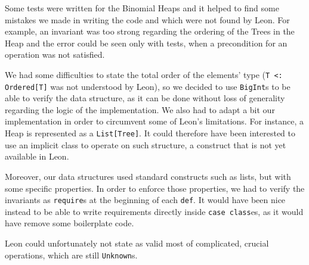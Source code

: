 Some tests were written for the Binomial Heaps and 
it helped to find some mistakes we made in writing the code and 
which were not found by Leon.
For example, an invariant was too strong regarding the ordering of the Trees in the Heap and 
the error could be seen only with tests,
when a precondition for an operation was not satisfied.

We had some difficulties to state the total order of the elements' type
(\texttt{T <: Ordered[T]} was not understood by Leon), 
so we decided to use \verb|BigInt|s to be able to verify the data structure,
as it can be done without loss of generality regarding the logic of the implementation.
We also had to adapt a bit our implementation in order to circumvent some of Leon's limitations.
For instance, a Heap is represented as a \texttt{List[Tree]}. 
It could therefore have been interested to use an implicit class to operate on such structure, 
a construct that is not yet available in Leon.

Moreover, our data structures used standard constructs such as lists, 
but with some specific properties. 
In order to enforce those properties, 
we had to verify the invariants as \texttt{require}s at the beginning of each \texttt{def}. 
It would have been nice instead to be able to write requirements directly inside \texttt{case class}es, 
as it would have remove some boilerplate code.

Leon could unfortunately not state as valid most of complicated, crucial operations, 
which are still \verb|Unknown|s.